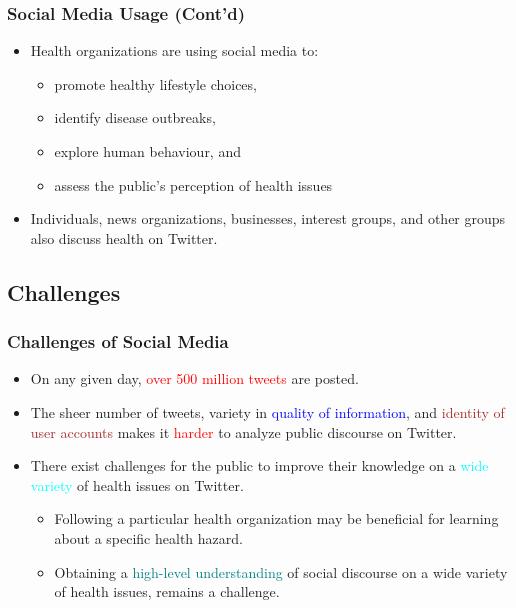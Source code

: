 \documentclass[11pt]{beamer}
\begin{document}
\begin{frame}
\frametitle{Social Media Usage (Cont'd)}
	\begin{itemize}
		\item<1-> Health organizations are using social media to:
		\begin{itemize}
			\item promote healthy lifestyle choices,
			\item identify disease outbreaks,
			\item explore human behaviour, and
			\item assess the public's perception of health issues
		\end{itemize}
		\item<2-> Individuals, news organizations, businesses, interest groups, and other groups also discuss health on Twitter.
	\end{itemize}
\end{frame}

\subsection{Challenges}
\begin{frame}
\frametitle{Challenges of Social Media}
	\begin{itemize}
		\item<1-> On any given day, \textcolor{red}{over 500 million tweets} are posted.
		\item<2-> The \textcolor{uwo-purple}{sheer number} of tweets, variety in \textcolor{blue}{quality of information}, and \textcolor{brown}{identity of user accounts} makes it \textcolor{red}{harder} to analyze public discourse on Twitter.
		\item<3-> There exist challenges for the public to improve their knowledge on a \textcolor{cyan}{wide variety} of health issues on Twitter.
		\begin{itemize}
			\item<4-> Following a particular health organization may be	beneficial for learning about a specific health hazard.
			\item<5-> Obtaining a \textcolor{teal}{high-level understanding} of social discourse on a wide variety of health issues, remains a challenge.
		\end{itemize}
	\end{itemize}
\end{frame}
\end{document}
